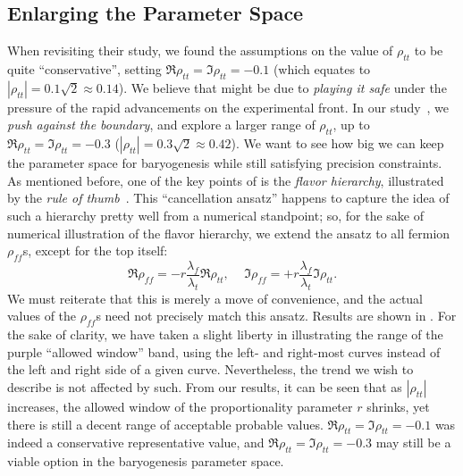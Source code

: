 \subsection{Enlarging the Parameter Space}
When revisiting their study, we found the assumptions on the value of \(\rho_{tt} \) to be quite ``conservative'', setting \(\Re\rho_{tt} = \Im\rho_{tt} = -0.1 \) (which equates to \(|\rho_{tt}| = 0.1\sqrt{2} \approx 0.14\)).
We believe that might be due to \textit{playing it safe} under the pressure of the rapid advancements on the experimental front. 
In our study~\cite{HKT2024eEDMnEDM}, we \textit{push against the boundary}, and explore a larger range of \(\rho_{tt} \), up to \(\Re\rho_{tt} = \Im\rho_{tt} = -0.3 \) (\(|\rho_{tt}| = 0.3\sqrt{2} \approx 0.42\)). 
We want to see how big we can keep the parameter space for baryogenesis while still satisfying precision constraints.
As mentioned before, one of the key points of {\gthdm} is the \textit{flavor hierarchy}, illustrated by the \textit{rule of thumb}~.
This ``cancellation ansatz'' happens to capture the idea of such a hierarchy pretty well from a numerical standpoint; 
so, for the sake of numerical illustration of the flavor hierarchy, we extend the ansatz to all fermion \(\rho_{ff} \)s, except for the top itself:
\begin{equation}\label{eq:ansatz-extended}
    \Re\rho_{ff} = -r\frac{\lambda_{f}}{\lambda_{t}}\Re\rho_{tt} \text{, } \quad \Im\rho_{ff} = +r\frac{\lambda_{f}}{\lambda_{t}}\Im\rho_{tt}.
\end{equation}
We must reiterate that this is merely a move of convenience, and the actual values of the \(\rho_{ff} \)s need not precisely match this ansatz.
Results are shown in .
For the sake of clarity, we have taken a slight liberty in illustrating the range of the purple ``allowed window'' band,
using the left- and right-most curves instead of the left and right side of a given curve.
Nevertheless, the trend we wish to describe is not affected by such.
From our results, it can be seen that as \(|\rho_{tt}| \) increases, the allowed window of the proportionality parameter \(r \) shrinks, yet there is still a decent range of acceptable probable values.
\(\Re\rho_{tt} = \Im\rho_{tt} = -0.1 \) was indeed a conservative representative value, and \(\Re\rho_{tt} = \Im\rho_{tt} = -0.3 \) may still be a viable option in the baryogenesis parameter space.

